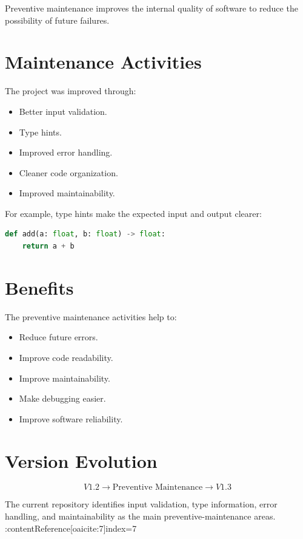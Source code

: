 \documentclass[12pt,a4paper]{report}
\begin{document}
Preventive maintenance improves the internal quality of software to
reduce the possibility of future failures.

\section{Maintenance Activities}

The project was improved through:

\begin{itemize}
    \item Better input validation.
    \item Type hints.
    \item Improved error handling.
    \item Cleaner code organization.
    \item Improved maintainability.
\end{itemize}

For example, type hints make the expected input and output clearer:

\begin{lstlisting}[language=Python]
def add(a: float, b: float) -> float:
    return a + b
\end{lstlisting}

\section{Benefits}

The preventive maintenance activities help to:

\begin{itemize}
    \item Reduce future errors.
    \item Improve code readability.
    \item Improve maintainability.
    \item Make debugging easier.
    \item Improve software reliability.
\end{itemize}

\section{Version Evolution}

\[
V1.2
\rightarrow
\text{Preventive Maintenance}
\rightarrow
V1.3
\]

The current repository identifies input validation, type information,
error handling, and maintainability as the main preventive-maintenance
areas. :contentReference[oaicite:7]{index=7}
\end{document}
